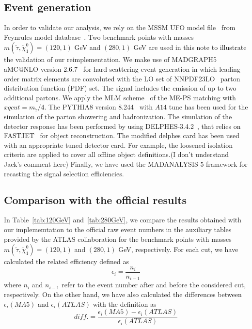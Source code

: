 \documentclass{ws-mpla}
\begin{document}
\subsection{Event generation}

In order to validate our analysis, we rely on the MSSM UFO model file~\cite{Duhr:2011se} from Feynrules model database~\cite{Alloul:2013bka}. 
Two benchmark points with masses $ m(\tilde{\tau},\tilde{\chi}^0_1)=(120,1) $ GeV and $ (280,1) $ GeV are used in this note to illustrate the validation of our reimplementation. 
We make use of MADGRAPH5 aMC@NLO version 2.6.7~\cite{Alwall:2014hca} for hard-scattering event generation in which leading-order matrix elements are convoluted with the {\color{blue}LO set of} NNPDF23LO~\cite{Martin:2009iq} parton distribution function (PDF) set. The signal includes the emission of up to two additional partons. We apply the MLM scheme~\cite{Mangano:2006rw,Alwall:2008qv} of the ME-PS matching with $xqcut = m_{\tilde{\tau}}/4$. 
The PYTHIA8 version 8.244~\cite{Sjostrand:2007gs} with $A14$ tune has been used for the simulation of the parton showering and hadronization. The simulation of the detector response has been performed by using DELPHES-3.4.2~\cite{deFavereau:2013fsa}, that relies on FASTJET~\cite{Cacciari:2011ma} for object reconstruction.
The modified delphes card has been used with an appropriate tuned detector card.
{\color{red}For example, the loosened isolation criteria are applied to cover all offline object definitions.(I don't understand Jack's comment here)}
Finally, we have used the {\color{blue}MADANALYSIS 5 framework for recasting} the signal selection efficiencies.



\subsection{Comparison with the official results}
In Table~\ref{tab:120GeV} and~\ref{tab:280GeV}, we compare the results obtained with our implememtation to the official raw event numbers in the auxiliary tables provided by the ATLAS collaboration for the benchmark points with masses $m(\tilde{\tau},\tilde{\chi}^0_1)=(120,1) $ and $(280,1)$ GeV, respectively. 
For each cut, we have calculated the related efficiency defined as 
\begin{equation}
\epsilon_i =\frac{n_i}{n_{i-1}}
\end{equation}
where $ n_i $ and $ n_{i-1} $ {\color{blue}refer to} the event number after and before the considered cut, respectively.
%
On the other hand, we have also calculated the differences between $ \epsilon_i (MA5)$ and $ \epsilon_i (ATLAS)$ with the definition as
\begin{equation}
diff. = \frac{\epsilon_i (MA5)-\epsilon_i (ATLAS)}{\epsilon_i (ATLAS)}
\end{equation}
\end{document}
